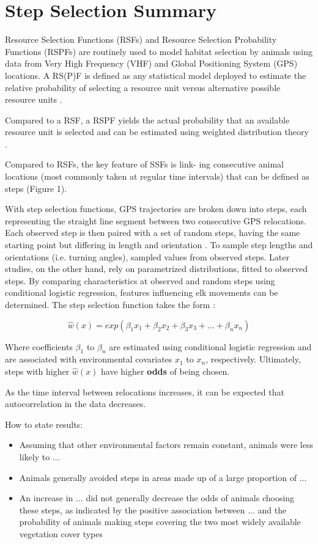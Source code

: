 \documentclass[abstract=off,10pt,a4paper,bibliography=totocnumbered]{article}
\begin{document}
\section{Step Selection Summary}
Resource Selection Functions (RSFs) and Resource Selection Probability Functions
(RSPFs) are routinely used to model habitat selection by animals using data from
Very High Frequency (VHF) and Global Positioning System (GPS) locations. A
RS(P)F is defined as any statistical model deployed to estimate the relative
probability of selecting a resource unit versus alternative possible resource
units \citep{Manly.2002}.

Compared to a RSF, a RSPF yields the actual probability that an available
resource unit is selected and can be estimated using weighted distribution
theory \citep{Lele.2006}.

Compared to RSFs, the key feature of SSFs is link- ing consecutive animal
locations (most commonly taken at regular time intervals) that can be defined as
steps \citep{Turchin.1998} (Figure 1).

With step selection functions, GPS trajectories are broken down into steps, each
representing the straight line segment between two consecutive GPS relocations.
Each observed step is then paired with a set of random steps, having the same
starting point but differing in length and orientation \citep{Fortin.2005}. To
sample step lengths and orientations (i.e. turning angles), \cite{Fortin.2005}
sampled values from observed steps. Later studies, on the other hand, rely on
parametrized distributions, fitted to observed steps. By comparing
characteristics at observed and random steps using conditional logistic
regression, features influencing elk movements can be determined. The step
selection function takes the form \citep{Fortin.2005}:

\begin{equation}
\label{EQ1}
\hat{w}(x) = exp(\beta_1 x_1 + \beta_2 x_2 + \beta_3 x_3 + ... + \beta_n x_n)
\end{equation}

Where coefficients \(\beta_1\) to \(\beta_n\) are estimated using conditional
logistic regression and are associated with environmental covariates \(x_1\) to
\(x_n\), respectively. Ultimately, steps with higher \(\hat{w}(x)\) have higher
\textbf{odds} of being chosen.

As the time interval between relocations increases, it can be expected that
autocorrelation in the data decreases.

How to state results:
\begin{itemize}
  \item  Assuming that other environmental factors remain constant, animals were
  less likely to ...
  \item Animals generally avoided steps in areas made up of a large proportion
  of ...
  \item  An increase in ... did not generally decrease the odds of animals
  choosing these steps, as indicated by the positive association between ... and
  the probability of animals making steps covering the two most widely available
  vegetation cover types
\end{itemize}


\newpage
\begingroup
\singlespacing

\endgroup
\end{document}
